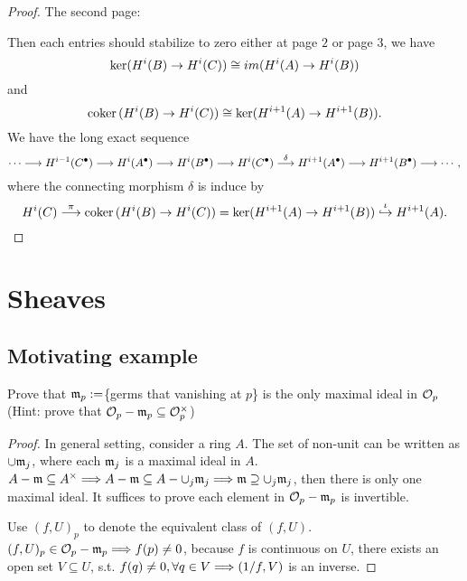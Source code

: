\documentclass[11pt]{book} %
\begin{document}
\begin{proof}
The second page:
\begin{center}
\end{center}
Then each entries should stabilize to zero either at page $2$ or page $3$, we have
$$
\ker(H^{i}(B)\rightarrow H^{i}(C))\cong im(H^{i}(A)\rightarrow H^{i}(B))
$$
and
$$
\text{coker\,}(H^{i}(B)\rightarrow H^{i}(C))\cong \ker (H^{i+1}(A)\rightarrow H^{i+1}(B)).
$$
We have the long exact sequence
$$
\cdots\longrightarrow H^{i-1}(C^{\bullet})\longrightarrow H^{i}(A^\bullet)\longrightarrow H^{i}(B^\bullet)\longrightarrow  H^{i}(C^\bullet)\overset{\delta}{\longrightarrow} H^{i+1}(A^\bullet)\longrightarrow H^{i+1}(B^\bullet)\longrightarrow \cdots,
$$
where the connecting morphism $\delta$ is induce by 
$$
H^{i}(C)\overset{\pi}{\longrightarrow}
\text{coker\,}(H^{i}(B)\rightarrow H^{i}(C))= \ker (H^{i+1}(A)\rightarrow H^{i+1}(B))\overset{\iota}{\hookrightarrow} H^{i+1}(A).
$$

\end{proof}




\chapter{Sheaves}
\section{Motivating example}
\begin{exr}
Prove that ${\mathfrak m}_p:=$\{germs that vanishing at $p$\} is the only maximal ideal in ${\cal O}_p$(Hint: prove that ${\cal O}_p-{\mathfrak m}_p\subseteq {\cal O}_p^{\times}$)
\end{exr}
\begin{proof}In general setting, consider a ring $A$.
The set of non-unit can be written as $\cup{\mathfrak m}_j$, where each ${\mathfrak m}_j$ is a maximal ideal in $A$. $A-{\mathfrak m}\subseteq A^\times\Longrightarrow A-{\mathfrak m}\subseteq A-\cup_j{\mathfrak m}_j\Longrightarrow {\mathfrak m}\supseteq\cup_j{\mathfrak m}_j$, then there is only one maximal ideal. It suffices to prove each element in ${\cal O}_p-{\mathfrak m}_p$ is invertible. 

Use $(f,U)_p$ to denote the equivalent class of $(f,U)$.
$(f,U)_p\in {\cal O}_p-{\mathfrak m}_p\Longrightarrow f(p)\neq 0$, because $f$ is continuous on $U$, there exists an open set $V\subseteq U$, s.t. $f(q)\neq0,\forall q\in V\Longrightarrow (1/f,V)$ is an inverse.
\end{proof}
\end{document}
